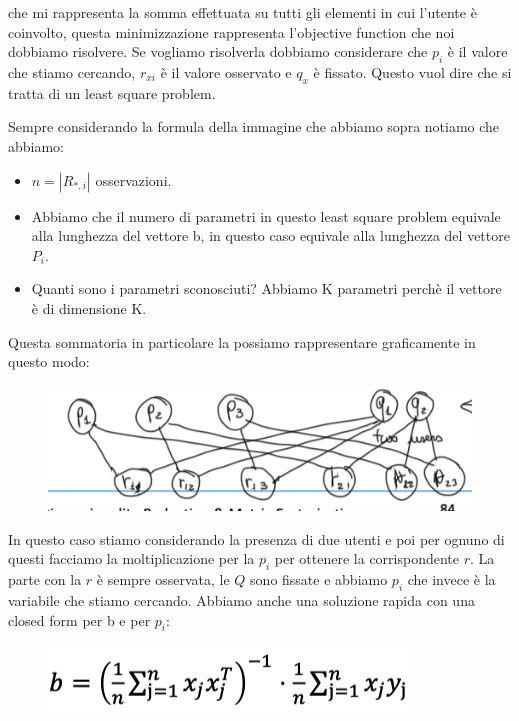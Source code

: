\documentclass[14pt]{extreport}
\begin{document}
che mi rappresenta la somma effettuata su tutti gli elementi in cui l'utente è coinvolto, questa minimizzazione rappresenta l'objective function che
noi dobbiamo risolvere. Se vogliamo risolverla dobbiamo considerare che $p_i$ è il valore che stiamo cercando, $r_{xi}$ è il valore osservato e $q_x$
è fissato. Questo vuol dire che si tratta di un least square problem.

Sempre considerando la formula della immagine che abbiamo sopra notiamo che abbiamo:

\begin{itemize}
	\item $n = |R_{*,i}|$ osservazioni.
	\item Abbiamo che il numero di parametri in questo least square problem equivale alla lunghezza del vettore b, in questo caso equivale alla
	lunghezza del vettore $P_i$.
	\item Quanti sono i parametri sconosciuti? Abbiamo K parametri perchè il vettore è di dimensione K.
\end{itemize}

Questa sommatoria in particolare la possiamo rappresentare graficamente in questo modo:


\begin{figure}[H]
	\centering
	\includegraphics[width=0.7\linewidth]{520.jpeg}
\end{figure}

In questo caso stiamo considerando la presenza di due utenti e poi per ognuno di questi facciamo la moltiplicazione per la $p_i$ per ottenere la
corrispondente $r$. La parte con la $r$ è sempre osservata, le $Q$ sono fissate e abbiamo $p_i$ che invece è la variabile che stiamo cercando. Abbiamo
anche una soluzione rapida con una closed form per b e per $p_i$:

\begin{figure}[H]
	\centering
	\includegraphics[width=0.7\linewidth]{521.jpeg}
\end{figure}
\end{document}
